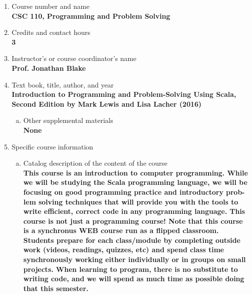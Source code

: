 \label{CSC110}  %
\begin{enumerate}[1.]
\item Course number and name\\
  {\bfseries
CSC 110, Programming and Problem Solving
  }

\item Credits and contact hours\\
  {\bfseries
3
  }

\item Instructor's or course coordinator's name\\
  {\bfseries
Prof. Jonathan Blake
  }

\item Text book, title, author, and year\\
  {\bfseries
    Introduction to Programming and Problem-Solving Using
Scala, Second Edition by Mark Lewis and Lisa Lacher (2016)
  }
\begin{enumerate}[a.]
\item Other supplemental materials\\
  {\bfseries
    None
  }
\end{enumerate}

\item Specific course information
\begin{enumerate}[a.]
\item Catalog description of the content of the course\\
  {\bfseries
This course is an introduction to computer programming. While we will be studying the Scala
programming language, we will be focusing on good programming practice and introductory prob-
lem solving techniques that will provide you with the tools to write efficient, correct code in any
programming language. This course is not just a programming course! Note that this course is
a synchronus WEB course run as a flipped classroom. Students prepare for each class/module
by completing outside work (videos, readings, quizzes, etc) and spend class time synchronously
working either individually or in groups on small projects. When learning to program, there is no
substitute to writing code, and we will spend as much time as possible doing that this semester.
  }


\end{enumerate}
\end{enumerate}
